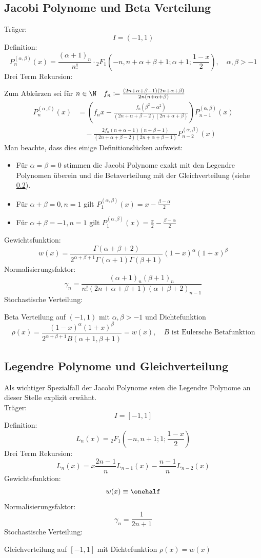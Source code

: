\subsection{Jacobi Polynome und Beta Verteilung}
Träger:
\[I=(-1,1)\]
Definition:
\[P_n^{(\alpha, \beta)}(x)=\frac{(\alpha + 1)_n}{n!}\cdot {_2F_1}\left(-n,n+\alpha+\beta+1;\alpha+1;\frac{1-x}{2}\right),\quad \alpha,\beta>-1\]
Drei Term Rekursion:
\begin{center}
Zum Abkürzen sei für $n\in\N\quad f_n \coloneqq \frac{(2n + \alpha + \beta - 1)(2n + \alpha + \beta)}{2n(n + \alpha + \beta)}$
\begin{align*}
P_n^{(\alpha, \beta)}(x)&=\left(f_nx-\frac{f_n(\beta^2-\alpha^2)}{(2n + \alpha + \beta - 2)(2n + \alpha +\beta)}\right)P_{n-1}^{(\alpha, \beta)}(x)\\
&\quad-\frac{2f_n(n + \alpha - 1)(n + \beta - 1)}{(2n + \alpha + \beta - 2)(2n + \alpha + \beta - 1)}P_{n-2}^{(\alpha, \beta)}(x)
\end{align*}
Man beachte, dass dies einige Definitionslücken aufweist:
\begin{itemize}
\item Für $\alpha=\beta=0$ stimmen die Jacobi Polynome exakt mit den Legendre Polynomen überein und die Betaverteilung mit der Gleichverteilung (siehe \ref{seclegendre}).
\item Für $\alpha+\beta=0,n=1$ gilt $P_1^{(\alpha,\beta)}(x)=x-\frac{\beta-\alpha}{2}$
\item Für $\alpha+\beta=-1,n=1$ gilt $P_1^{(\alpha,\beta)}(x)=\frac{x}{2}-\frac{\beta-\alpha}{2}$
\end{itemize}
\end{center}
Gewichtsfunktion:
\[w(x)=\frac{\Gamma(\alpha+\beta+2)}{2^{\alpha+\beta+1}\Gamma(\alpha+1)\Gamma(\beta+1)}(1-x)^\alpha(1+x)^\beta\]
Normalisierungsfaktor:
\[\gamma_n=\frac{(\alpha+1)_n(\beta+1)_n}{n!(2n+\alpha+\beta+1)(\alpha+\beta+2)_{n-1}}\]
Stochastische Verteilung:
\begin{center}
Beta Verteilung auf $(-1,1)$ mit $\alpha,\beta>-1$ und Dichtefunktion
\[\rho(x)=\frac{(1 - x)^\alpha(1 + x)^\beta}{2^{\alpha + \beta + 1}B(\alpha+1,\beta+1)}=w(x),\quad B\text{ ist Eulersche Betafunktion}\]
\end{center}

\subsection{Legendre Polynome und Gleichverteilung}
\label{seclegendre}
Als wichtiger Spezialfall der Jacobi Polynome seien die Legendre Polynome an dieser Stelle explizit erwähnt.\\
Träger:
\[I=[-1,1]\]
Definition:
\[L_n(x)={_2F_1}\left(-n,n+1;1;\frac{1-x}{2}\right)\]
Drei Term Rekursion:
\[L_{n}(x)=x\frac{2n-1}{n}L_{n-1}(x)-\frac{n-1}{n}L_{n-2}(x)\]
Gewichtsfunktion:
\[w(x)\equiv \onehalf\]
Normalisierungsfaktor:
\[\gamma_n=\frac{1}{2n+1}\]
Stochastische Verteilung:
\begin{center}
Gleichverteilung auf $[-1,1]$ mit Dichtefunktion $\rho(x)=w(x)$
\end{center}

